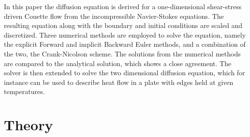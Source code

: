 \documentclass[aps,reprint]{revtex4-1}
\begin{document}
In this paper the diffusion equation is derived for a one-dimensional shear-stress
driven Couette flow from the incompressible Navier-Stokes equations. The resulting
equation along with the boundary and initial conditions are scaled and discretized.
Three numerical methods are employed to solve the equation, namely the explicit Forward and
implicit Backward Euler methods, and a combination of the two, the Crank-Nicolson scheme.
The solutions from the numerical methods are compared to the analytical solution, which
shows a close agreement. The solver is then extended to solve the two dimensional
diffusion equation, which for instance can be used to describe heat flow in a
plate with edges held at given temperatures.
\section{Theory} \label{sec:theory}
\end{document}
